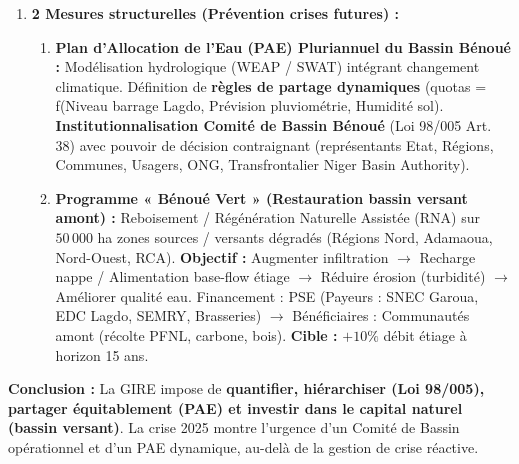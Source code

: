 \documentclass[11pt]{article}
\begin{document}
\begin{exoresolu}
\begin{enumerate}
\begin{enumerate}
            \item \textbf{Opération « Eau pour le Bétail » :} Déploiement de $20$ unités mobiles de pompage solaire + abreuvoirs (capacité $10$ m$^3$/j chacune) sur points stratégiques transhumance (loin du fleuve, zones pâturages résiduels). Budget urgence : $50$ M FCFA (Fonds National de Gestion des Risques / MINADER/MINEPIA).
            \item \textbf{Surveillance qualitative renforcée + Alerte :} 3 stations automatiques (Amont Garoua, Aval Lagdo, Parc Bénoué) : Niveau, $T^\circ$, $O_2$, Turbidité, $\ce{NO3-}$. Seuil alerte $O_2 < 3$ mg/L $\rightarrow$ Aération d'urgence / Arrêt rejets industriels. Information quotidienne radio locale (fulfulde, français) sur niveau fleuve / qualité / points d'eau bétail.
        \end{enumerate}
        \item \textbf{2 Mesures structurelles (Prévention crises futures) :}
        \begin{enumerate}
            \item \textbf{Plan d'Allocation de l'Eau (PAE) Pluriannuel du Bassin Bénoué :} Modélisation hydrologique (WEAP / SWAT) intégrant changement climatique. Définition de \textbf{règles de partage dynamiques} (quotas = f(Niveau barrage Lagdo, Prévision pluviométrie, Humidité sol). \textbf{Institutionnalisation Comité de Bassin Bénoué} (Loi 98/005 Art. 38) avec pouvoir de décision contraignant (représentants Etat, Régions, Communes, Usagers, ONG, Transfrontalier Niger Basin Authority).
            \item \textbf{Programme « Bénoué Vert » (Restauration bassin versant amont) :} Reboisement / Régénération Naturelle Assistée (RNA) sur $50\,000$ ha zones sources / versants dégradés (Régions Nord, Adamaoua, Nord-Ouest, RCA). \textbf{Objectif :} Augmenter infiltration $\rightarrow$ Recharge nappe / Alimentation base-flow étiage $\rightarrow$ Réduire érosion (turbidité) $\rightarrow$ Améliorer qualité eau. Financement : PSE (Payeurs : SNEC Garoua, EDC Lagdo, SEMRY, Brasseries) $\rightarrow$ Bénéficiaires : Communautés amont (récolte PFNL, carbone, bois). \textbf{Cible :} $+ 10\%$ débit étiage à horizon 15 ans.
        \end{enumerate}
    \end{enumerate}
    \textbf{Conclusion :} La GIRE impose de \textbf{quantifier, hiérarchiser (Loi 98/005), partager équitablement (PAE) et investir dans le capital naturel (bassin versant)}. La crise 2025 montre l'urgence d'un Comité de Bassin opérationnel et d'un PAE dynamique, au-delà de la gestion de crise réactive.
\end{exoresolu}
\end{document}
